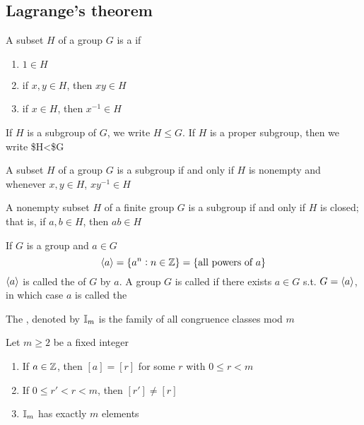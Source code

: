 \documentclass[11pt]{article}
\begin{document}
\subsection{Lagrange's theorem}
\label{sec:org2abd846}
\begin{definition}[]
A subset \(H\) of a group \(G\) is a  if
\begin{enumerate}
\item \(1\in H\)
\item if \(x,y\in H\), then \(xy\in H\)
\item if \(x\in H\), then \(x^{-1}\in H\)
\end{enumerate}
\end{definition}

If \(H\) is a subgroup of \(G\), we write \(H\le G\). If \(H\) is a proper subgroup,
then we write \$H<\$G

\begin{proposition}[]
A subset \(H\) of a group \(G\) is a subgroup if and only if \(H\) is nonempty and
whenever \(x,y\in H\), \(xy^{-1}\in H\)
\end{proposition}

\begin{proposition}[]
A nonempty subset \(H\) of a finite group \(G\) is a subgroup if and only if \(H\)
is closed; that is, if \(a,b\in H\), then \(ab\in H\)
\end{proposition}

\begin{definition}[]
If \(G\) is a group and \(a\in G\)
\begin{equation*}
\langle a\rangle=\{a^n:n\in\mathbb{Z}\}=\{\text{all powers of } a\}
\end{equation*}
\(\langle a\rangle\) is called the  of \(G\)  by \(a\). A
group \(G\) is called  if there exists \(a\in G\) s.t. \(G=\langle a\rangle\),
in which case \(a\) is called the 
\end{definition}

\begin{definition}[]
The , denoted by \(\mathbb{I}_m\) is the family of all congruence
classes mod \(m\)
\end{definition}


\begin{proposition}[]
Let \(m\ge 2\) be a fixed integer
\begin{enumerate}
\item If \(a\in \mathbb{Z}\), then \([a]=[r]\) for some \(r\) with \(0\le r<m\)
\item If \(0\le r'<r<m\), then \([r']\neq[r]\)
\item \(\mathbb{I}_m\) has exactly \(m\) elements
\end{enumerate}
\end{proposition}
\end{document}

